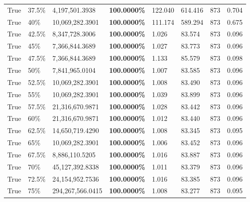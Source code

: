 \begin{table}[H]
{\begin{tabular}{lllrllll}
\cline{1-8} \cline{2-8}
True & 37.5\% & 4,197,501.3938 & \bfseries \color{red} 100.0000\% & 122.040 & 614.416 & 873 & 0.704 \\
\cline{1-8} \cline{2-8}
True & 40\% & 10,069,282.3901 & \bfseries \color{red} 100.0000\% & 111.174 & 589.294 & 873 & 0.675 \\
\cline{1-8} \cline{2-8}
True & 42.5\% & 8,347,728.3006 & \bfseries \color{red} 100.0000\% & 1.026 & 83.574 & 873 & 0.096 \\
\cline{1-8} \cline{2-8}
True & 45\% & 7,366,844.3689 & \bfseries \color{red} 100.0000\% & 1.027 & 83.773 & 873 & 0.096 \\
\cline{1-8} \cline{2-8}
True & 47.5\% & 7,366,844.3689 & \bfseries \color{red} 100.0000\% & 1.133 & 85.579 & 873 & 0.098 \\
\cline{1-8} \cline{2-8}
True & 50\% & 7,841,965.0104 & \bfseries \color{red} 100.0000\% & 1.007 & 83.585 & 873 & 0.096 \\
\cline{1-8} \cline{2-8}
True & 52.5\% & 10,069,282.3901 & \bfseries \color{red} 100.0000\% & 1.008 & 83.490 & 873 & 0.096 \\
\cline{1-8} \cline{2-8}
True & 55\% & 10,069,282.3901 & \bfseries \color{red} 100.0000\% & 1.039 & 83.899 & 873 & 0.096 \\
\cline{1-8} \cline{2-8}
True & 57.5\% & 21,316,670.9871 & \bfseries \color{red} 100.0000\% & 1.028 & 83.442 & 873 & 0.096 \\
\cline{1-8} \cline{2-8}
True & 60\% & 21,316,670.9871 & \bfseries \color{red} 100.0000\% & 1.012 & 83.440 & 873 & 0.096 \\
\cline{1-8} \cline{2-8}
True & 62.5\% & 14,650,719.4290 & \bfseries \color{red} 100.0000\% & 1.008 & 83.345 & 873 & 0.095 \\
\cline{1-8} \cline{2-8}
True & 65\% & 10,069,282.3901 & \bfseries \color{red} 100.0000\% & 1.006 & 83.452 & 873 & 0.096 \\
\cline{1-8} \cline{2-8}
True & 67.5\% & 8,886,110.5205 & \bfseries \color{red} 100.0000\% & 1.016 & 83.887 & 873 & 0.096 \\
\cline{1-8} \cline{2-8}
True & 70\% & 45,127,392.8338 & \bfseries \color{red} 100.0000\% & 1.011 & 83.379 & 873 & 0.096 \\
\cline{1-8} \cline{2-8}
True & 72.5\% & 24,154,952.7536 & \bfseries \color{red} 100.0000\% & 1.016 & 83.385 & 873 & 0.096 \\
\cline{1-8} \cline{2-8}
True & 75\% & 294,267,566.0415 & \bfseries \color{red} 100.0000\% & 1.008 & 83.277 & 873 & 0.095 \\

\end{tabular}}
\end{table}
